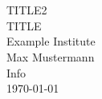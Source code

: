 


\begin{titlepage}
   \mbox{}\vspace{2\baselineskip}\\
   \rmfamily\huge
   \centering
	\mbox{}\vspace{2\baselineskip}\\
   TITLE2\\
	\textsc{TITLE}\\
   \vspace{3\baselineskip}
   \rmfamily\Large
   Example Institute
   \vspace{2\baselineskip}\\
   \rmfamily\Large
   Max Mustermann\\
   Info
   \vspace{1\baselineskip}\\
   \today
\end{titlepage}
